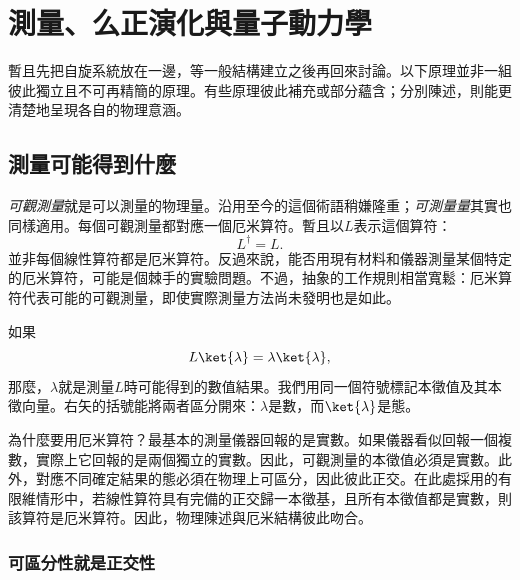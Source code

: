 \chapter{測量、么正演化與量子動力學}


暫且先把自旋系統放在一邊，等一般結構建立之後再回來討論。以下原理並非一組彼此獨立且不可再精簡的原理。有些原理彼此補充或部分蘊含；分別陳述，則能更清楚地呈現各自的物理意涵。

\section{測量可能得到什麼}

\emph{可觀測量}就是可以測量的物理量。沿用至今的這個術語稍嫌隆重；\emph{可測量量}其實也同樣適用。每個可觀測量都對應一個厄米算符。暫且以\(L\)表示這個算符：
\begin{equation}
L^\dagger=L.
\end{equation}
並非每個線性算符都是厄米算符。反過來說，能否用現有材料和儀器測量某個特定的厄米算符，可能是個棘手的實驗問題。不過，抽象的工作規則相當寬鬆：厄米算符代表可能的可觀測量，即使實際測量方法尚未發明也是如此。

如果
\begin{equation}
L\ket{\lambda}=\lambda\ket{\lambda},
\end{equation}
那麼，\(\lambda\)就是測量\(L\)時可能得到的數值結果。我們用同一個符號標記本徵值及其本徵向量。右矢的括號能將兩者區分開來：\(\lambda\)是數，而\(\ket{\lambda}\)是態。

為什麼要用厄米算符？最基本的測量儀器回報的是實數。如果儀器看似回報一個複數，實際上它回報的是兩個獨立的實數。因此，可觀測量的本徵值必須是實數。此外，對應不同確定結果的態必須在物理上可區分，因此彼此正交。在此處採用的有限維情形中，若線性算符具有完備的正交歸一本徵基，且所有本徵值都是實數，則該算符是厄米算符。因此，物理陳述與厄米結構彼此吻合。

\subsection{可區分性就是正交性}

